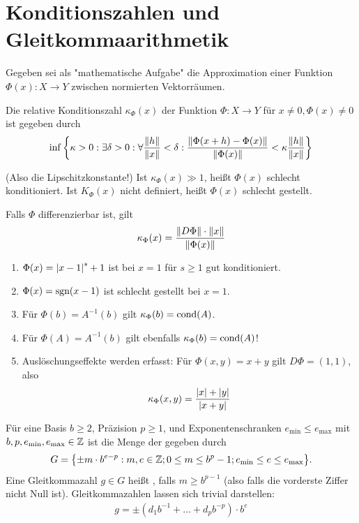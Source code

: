 \documentclass{report}
\begin{document}
	\chapter{Konditionszahlen und Gleitkommaarithmetik}
	Gegeben sei als "mathematische Aufgabe" die Approximation einer Funktion $\Phi(x) : X \to Y$ zwischen normierten Vektorräumen.
	\begin{definition}
		Die relative Konditionszahl $\kappa_\Phi(x)$ der Funktion $\Phi : X \to Y$ für $x \neq 0, \Phi(x) \neq 0$ ist gegeben durch $$\inf \lr{\kappa > 0 : \exists \delta > 0 : \forall \frac{\norm{h}}{\norm{x}} < \delta : \frac{\norm{\Phi(x + h) - \Phi(x)}}{\norm{\Phi(x)}} < \kappa \frac{\norm{h}}{\norm{x}}}$$
	\end{definition}
	(Also die Lipschitzkonstante!)
	\newpar
	Ist $\kappa_\Phi(x) \gg 1$, heißt $\Phi(x)$ schlecht konditioniert. Ist $K_\Phi(x)$ nicht definiert, heißt $\Phi(x)$ schlecht gestellt.
	\begin{theorem}
		Falls $\Phi$ differenzierbar ist, gilt
		\begin{align*}
			\kappa_\Phi(x) = \frac{\norm{D \Phi} \cdot \norm{x}}{\norm{\Phi(x)}}
		\end{align*}
	\end{theorem}
	\begin{example}
		\begin{enumerate}
			\item $\Phi(x) = \abs{x-1}^s + 1$ ist bei $x = 1$ für $s \geq 1$ gut konditioniert.
			\item $\Phi(x) = \textnormal{sgn}(x - 1)$ ist schlecht gestellt bei $x = 1$.
			\item Für $\Phi(b) = A^{-1}(b)$ gilt $\kappa_\Phi(b) = \textnormal{cond}(A)$.
			\item Für $\Phi(A) = A^{-1}(b)$ gilt ebenfalls $\kappa_\Phi(b) = \textnormal{cond}(A)$!
			\item Auslöschungseffekte werden erfasst: Für $\Phi(x,y) = x + y$ gilt $D \Phi = (1,1)$, also
			\begin{align*}
				\kappa_\Phi(x,y) = \frac{\abs{x} + \abs{y}}{\abs{x + y}}
			\end{align*}
		\end{enumerate}
	\end{example}
	\begin{definition}
		Für eine Basis $b \geq 2$, Präzision $p \geq 1$, und Exponentenschranken $e_{\min} \leq e_{\max}$ mit $b,p,e_{\min},e_{\max} \in \mathbb{Z}$ ist die Menge der  gegeben durch
		\begin{align*}
			G = \qty{\pm m \cdot b^{e-p} : m,e \in \mathbb{Z}; 0 \leq m \leq b^p-1; e_{\min} \leq e \leq e_{\max}}.
		\end{align*}
		Eine Gleitkommazahl $g \in G$ heißt , falls $m \geq b^{p-1}$ (also falls die vorderste Ziffer nicht Null ist).
		\newpar
		Gleitkommazahlen lassen sich trivial  darstellen:
		\begin{align*}
			g = \pm (d_1 b^{-1} + \hdots + d_p b^{-p}) \cdot b^e
		\end{align*}
	\end{definition}
\end{document}
